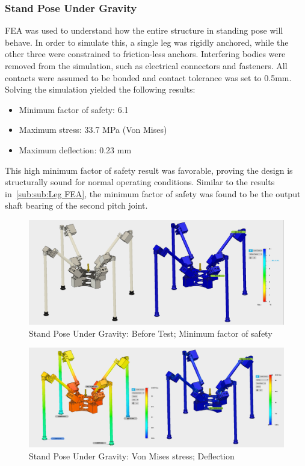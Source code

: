 \subsubsection{Stand Pose Under Gravity}\label{sub:sub:Stand FEA} FEA was used to understand how the entire structure in standing pose will behave. In order to simulate this, a single leg was rigidly anchored, while the other three were constrained to friction-less anchors. Interfering bodies were removed from the simulation, such as electrical connectors and fasteners. All contacts were assumed to be bonded and contact tolerance was set to 0.5mm.
Solving the simulation yielded the following results:
 \begin{itemize}
     \item Minimum factor of safety: 6.1
     \item Maximum stress: 33.7 MPa (Von Mises)
     \item Maximum deflection: 0.23 mm 
 \end{itemize}
 
This high minimum factor of safety result was favorable, proving the design is structurally sound for normal operating conditions. Similar to the results in~\ref{sub:sub:Leg FEA}, the minimum factor of safety was found to be the output shaft bearing of the second pitch joint.





 
\begin{figure}
\centering
\includegraphics[width=1.0\columnwidth]{./img/aquaShoko-v3dot3-FEA-Standing-1.png}
\caption{Stand Pose Under Gravity: Before Test; Minimum factor of safety }
\label{fig:test two pressure check}
\end{figure}

\begin{figure}[h]
\centering
\includegraphics[width=1.0\columnwidth]{./img/aquaShoko-v3dot3-FEA-Standing-2.png}
\caption{Stand Pose Under Gravity: Von Mises stress; Deflection}
\label{fig:test two pressure check}
\end{figure}


